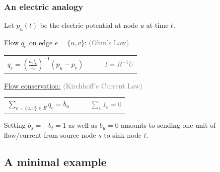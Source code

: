 \documentclass[	hyperref={pdfpagelabels=false}, xcolor=dvipsnames,
		11pt]{beamer}
\begin{document}
\begin{frame}
    \frametitle{An electric analogy} 

	Let $p_u(t)$ be the electric potential at node $u$ at time $t$. 
	
	\begin{alertblock}{\underline{Flow $q_e$ on edge $e = \{u,v\}$:} \textcolor{Gray}{(Ohm's Law)} }
	  \begin{center}
	  \begin{tabular}{ccc}
	 

	 
	    $q_e = (\frac{a_e l_e}{  x_e})^{-1} (p_u - p_v )$ & $\quad $ & \textcolor{Gray}{$I = R^{-1} U $} \\
	 
	 
	  \end{tabular}
	  \end{center}
	\end{alertblock}

	
	\begin{alertblock}{\underline{Flow conservation:} \textcolor{Gray}{(Kirchhoff's Current Law)}}
	  \begin{center}
	  \begin{tabular}{ccc}
	 

	 
	    $\sum\limits_{e = \{u,v\} \in E} q_e = b_u $ & $\quad $ & \textcolor{Gray}{$\sum\limits_{k} I_k = 0$} \\
	 
	 
	  \end{tabular}
	  \end{center}
	\end{alertblock}

	Setting $b_s = - b_t = 1$ as well as $ b_u = 0$ amounts to sending one unit of flow/current from source node $s$ to sink node $t$.




\end{frame}



\subsection{A minimal example}
\end{document}

